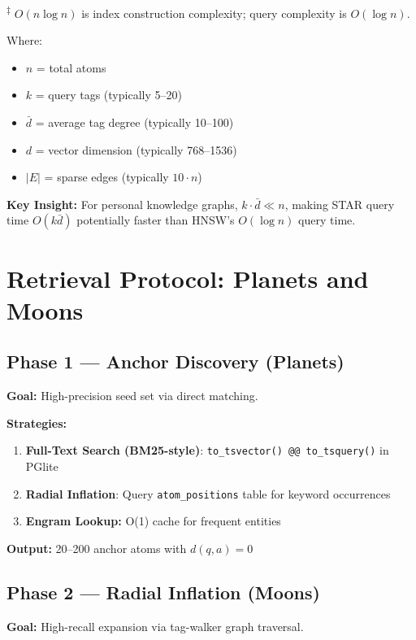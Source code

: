 \documentclass[11pt]{article}
\begin{document}
\textsuperscript{$\ddagger$} $O(n \log n)$ is index construction complexity; query complexity is $O(\log n)$.

Where:
\begin{itemize}
    \item $n$ = total atoms
    \item $k$ = query tags (typically 5--20)
    \item $\bar{d}$ = average tag degree (typically 10--100)
    \item $d$ = vector dimension (typically 768--1536)
    \item $|E|$ = sparse edges (typically $10 \cdot n$)
\end{itemize}

\textbf{Key Insight:} For personal knowledge graphs, $k \cdot \bar{d} \ll n$, making STAR query time $O(k\bar{d})$ potentially faster than HNSW's $O(\log n)$ query time.

\section{Retrieval Protocol: Planets and Moons}
\label{sec:retrieval}

\subsection{Phase 1 --- Anchor Discovery (Planets)}

\textbf{Goal:} High-precision seed set via direct matching.

\textbf{Strategies:}
\begin{enumerate}
    \item \textbf{Full-Text Search (BM25-style)}: \texttt{to\_tsvector() @@ to\_tsquery()} in PGlite
    \item \textbf{Radial Inflation}: Query \texttt{atom\_positions} table for keyword occurrences
    \item \textbf{Engram Lookup:} O(1) cache for frequent entities
\end{enumerate}

\textbf{Output:} 20--200 anchor atoms with $d(q,a) = 0$

\subsection{Phase 2 --- Radial Inflation (Moons)}

\textbf{Goal:} High-recall expansion via tag-walker graph traversal.
\end{document}
